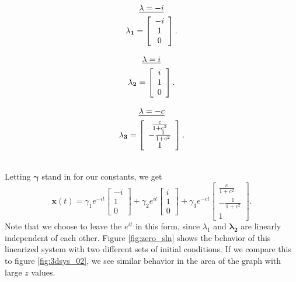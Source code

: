 \documentclass{article}
\begin{document}
\begin{minipage}{0.3\textwidth}
	\begin{gather*}
		\text{\underline{$\lambda=-i$}}\\
		\mathbf{\lambda_{1}}=\left[
		\begin{array}{c}
			-i \\
			1  \\
			0
		\end{array}
		\right].
	\end{gather*}
\end{minipage}
\begin{minipage}{0.3\textwidth}
	\begin{gather*}
		\text{\underline{$\lambda=i$}}\\
		\mathbf{\lambda_{2}}=\left[
		\begin{array}{c}
			i \\
			1 \\
			0
		\end{array}
		\right].
	\end{gather*}
\end{minipage}
\begin{minipage}{0.3\textwidth}
	\begin{gather*}
		\text{\underline{$\lambda=-c$}}\\
		\mathbf{\lambda_{3}}=\left[
		\begin{array}{c}
			\frac{c}{1+c^{2}}  \\
			-\frac{1}{1+c^{2}} \\
			1
		\end{array}
		\right].
	\end{gather*}
\end{minipage}

\noindent\\
\noindent Letting $\mathbf{\gamma}$ stand in for our constants, we get
\[
	\mathbf{x}(t) =
	\gamma_{1}e^{-it}\left[
	\begin{array}{c}
		-i \\
		1  \\
		0
	\end{array}
	\right] +
	\gamma_{2}e^{it}
	\left[
	\begin{array}{c}
		i \\
		1 \\
		0
	\end{array}
	\right] +
	\gamma_{3}e^{-ct}\left[
	\begin{array}{c}
		\frac{c}{1+c^{2}}  \\
		-\frac{1}{1+c^{2}} \\
		1
	\end{array}
	\right].
\]
Note that we choose to leave the $e^{it}$ in this form, since \textbf{${\lambda_{1}}$} and $\mathbf{\lambda_{2}}$ are linearly independent of each other. Figure \ref{fig:zero_sln} shows the behavior of this linearized system with two different sets of initial conditions. If we compare this to figure \ref{fig:3dsys_02}, we see similar behavior in the area of the graph with large $z$ values.
\end{document}
